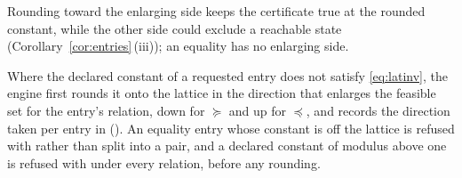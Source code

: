 
Rounding toward the enlarging side keeps the certificate true at the rounded
constant, while the other side could exclude a reachable state
(Corollary~\ref{cor:entries}\,(iii)); an equality has no enlarging side.

\begin{requirement}\label{req:caller-constant-rounding}
Where the declared constant of a requested entry does not satisfy
\eqref{eq:latinv}, the engine first rounds it onto the lattice in the
direction that enlarges the feasible set for the entry's relation, down for
$\succeq$ and up for $\preceq$, and records the direction taken per entry in
 (). An
equality entry whose constant is off the lattice is refused with
 rather than split into a pair, and a
declared constant of modulus above one is refused with
 under every relation, before any
rounding.
\end{requirement}
